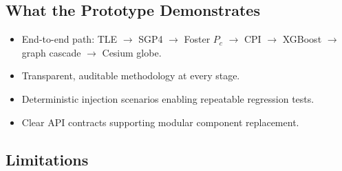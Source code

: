 \documentclass[conference]{IEEEtran}
\newcommand{\Pc}{P_c}
\begin{document}
\subsection{What the Prototype Demonstrates}

\begin{itemize}
  \item End-to-end path: TLE $\to$ SGP4 $\to$ Foster $\Pc$ $\to$ CPI $\to$
        XGBoost $\to$ graph cascade $\to$ Cesium globe.
  \item Transparent, auditable methodology at every stage.
  \item Deterministic injection scenarios enabling repeatable regression tests.
  \item Clear API contracts supporting modular component replacement.
\end{itemize}

\subsection{Limitations}
\end{document}
